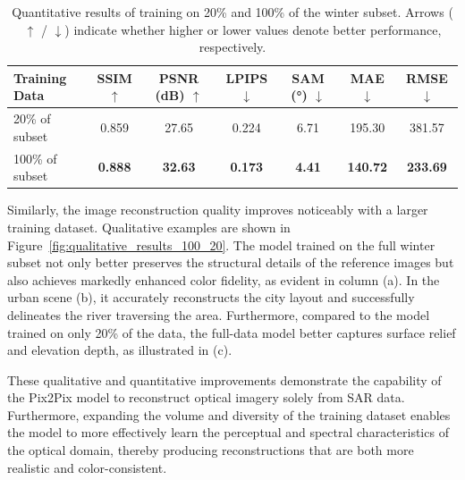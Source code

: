 \begin{table}[!htbp]
    \centering
    \caption[Quantitative results for different training data scales: 20\% \& 100\%]{Quantitative results of training on 20\% and 100\% of the winter subset. Arrows ($\uparrow$ / $\downarrow$) indicate whether higher or lower values denote better performance, respectively.}
    \begin{tabular}{lcccccc}
        \toprule
        \textbf{Training Data} & \textbf{SSIM $\uparrow$} & \textbf{PSNR (dB) $\uparrow$} & \textbf{LPIPS $\downarrow$} & \textbf{SAM (°) $\downarrow$} & \textbf{MAE $\downarrow$} & \textbf{RMSE $\downarrow$} \\
        \midrule
        20\% of subset         & 0.859                    & 27.65                         & 0.224                       & 6.71                          & 195.30                    & 381.57                     \\
        100\% of subset        & \textbf{0.888}           & \textbf{32.63}                & \textbf{0.173}              & \textbf{4.41}                 & \textbf{140.72}           & \textbf{233.69}            \\
        \bottomrule
    \end{tabular}
    \label{tab:quantitative_result_scale}
\end{table} 
Similarly, the image reconstruction quality improves noticeably with a larger training dataset. Qualitative examples are shown in Figure~\ref{fig:qualitative_results_100_20}. The model trained on the full winter subset not only better preserves the structural details of the reference images but also achieves markedly enhanced color fidelity, as evident in column (a). In the urban scene (b), it accurately reconstructs the city layout and successfully delineates the river traversing the area. Furthermore, compared to the model trained on only 20\% of the data, the full-data model better captures surface relief and elevation depth, as illustrated in (c).

These qualitative and quantitative improvements demonstrate the capability of the Pix2Pix model to reconstruct optical imagery solely from SAR data. Furthermore, expanding the volume and diversity of the training dataset enables the model to more effectively learn the perceptual and spectral characteristics of the optical domain, thereby producing reconstructions that are both more realistic and color-consistent.

